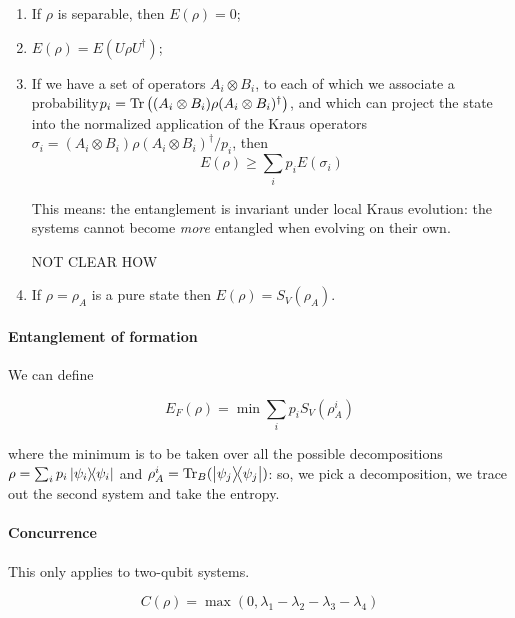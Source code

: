 \documentclass[main.tex]{subfiles}
\begin{document}
\begin{enumerate}
    \item If \(\rho\) is separable, then \(E(\rho)=0\);
    \item \(E(\rho) = E(U \rho U ^\dag)\);
    \item If we have
    a set of operators \(A_i \otimes B_i\), to each of which
    we associate a probability\linebreak[4]
     \(p_i = \operatorname*{Tr} \qty((A_i \otimes B_i) \rho (A_i \otimes B_i)^\dag)\), and which can project the state into the normalized application of the Kraus operators \(\sigma_i = (A_i \otimes B_i) \rho (A_i \otimes B_i) ^\dag / p_i\), then
    \begin{equation}
        E(\rho) \geq \sum _{i}  p_i E(\sigma_i)
    \end{equation}
    \begin{greenbox}
    This means: the entanglement is invariant under local Kraus evolution: the systems cannot become \emph{more} entangled when evolving on their own.

    NOT CLEAR HOW
    \end{greenbox}
    \item If \(\rho = \rho_{A}\) is a pure state then \(E(\rho) = S_V(\rho_A)\).
\end{enumerate}

\paragraph{Entanglement of formation}

We can define

\begin{equation}
    E_F (\rho) = \min \sum_i p_i S_V(\rho_A^i)
\end{equation}

where the minimum is to be taken over all the possible decompositions \(\rho = \sum _{i}  p_i \dyad{\psi_i}\) and \(\rho_A^i = \Tr _B (\dyad{\psi_j}) \): so, we pick a decomposition, we trace out the second system and take the entropy.

\paragraph{Concurrence}

This only applies to two-qubit systems.

\begin{equation}
    C(\rho) = \max(0, \lambda_1 - \lambda_2 - \lambda_3 - \lambda_4)
\end{equation}
\end{document}
